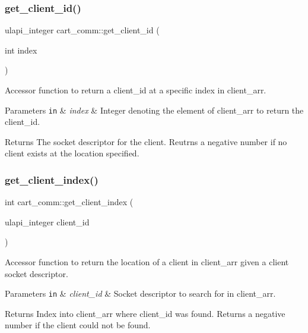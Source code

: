 \subsubsection{\texorpdfstring{get\+\_\+client\+\_\+id()}{get\_client\_id()}}
{\footnotesize\ttfamily ulapi\+\_\+integer cart\+\_\+comm\+::get\+\_\+client\+\_\+id (\begin{DoxyParamCaption}\item[{int}]{index }\end{DoxyParamCaption})}

Accessor function to return a client\+\_\+id at a specific index in client\+\_\+arr. 
\begin{DoxyParams}[1]{Parameters}
\mbox{\tt in}  & {\em index} & Integer denoting the element of client\+\_\+arr to return the client\+\_\+id. \\
\hline
\end{DoxyParams}
\begin{DoxyReturn}{Returns}
The socket descriptor for the client. Reutrns a negative number if no client exists at the location specified. 
\end{DoxyReturn}
\mbox{\label{classcart__comm_a6dcf8cc0eedecebcd436653da2ab680d}} 
\subsubsection{\texorpdfstring{get\+\_\+client\+\_\+index()}{get\_client\_index()}}
{\footnotesize\ttfamily int cart\+\_\+comm\+::get\+\_\+client\+\_\+index (\begin{DoxyParamCaption}\item[{ulapi\+\_\+integer}]{client\+\_\+id }\end{DoxyParamCaption})}

Accessor function to return the location of a client in client\+\_\+arr given a client socket descriptor. 
\begin{DoxyParams}[1]{Parameters}
\mbox{\tt in}  & {\em client\+\_\+id} & Socket descriptor to search for in client\+\_\+arr. \\
\hline
\end{DoxyParams}
\begin{DoxyReturn}{Returns}
Index into client\+\_\+arr where client\+\_\+id was found. Returns a negative number if the client could not be found. 
\end{DoxyReturn}
\mbox{\label{classcart__comm_a00fdba1bcb1d3e7234c83a1b2d692947}} 
